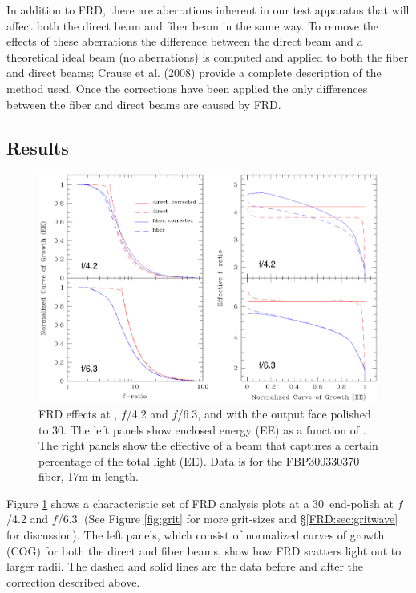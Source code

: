 In addition to FRD, there are aberrations inherent in our test
apparatus that will affect both the direct beam and fiber beam in the
same way. To remove the effects of these aberrations the difference
between the direct beam and a theoretical ideal beam (no aberrations)
is computed and applied to both the fiber and direct beams; Crause et
al. (2008)\cite{Crause_08} provide a complete description of the
method used. Once the corrections have been applied the only
differences between the fiber and direct beams are caused by FRD.

\subsection{Results}
\label{FRD:sec:results}

\begin{figure}[ht]
\begin{center}
\includegraphics[width=\textwidth, trim=0 2.6in 0 0, clip=true]{FRD/figs/basic_FRD.eps}
\caption[Example FRD analysis plots]{\fixspacing\label{fig:basicFRD} FRD
  effects at \filty, $f$/4.2 and $f$/6.3, and with the output face polished to
  30\mum. The left panels show enclosed energy (EE) as a function of
  \fratio. The right panels show the effective \fratio of a beam that captures
  a certain percentage of the total light (EE). Data is for the FBP300330370
  fiber, 17m in length.}
\end{center}
\end{figure}

Figure \ref{fig:basicFRD} shows a characteristic set of FRD analysis
plots at a 30\mum\ end-polish at $f$/4.2 and $f$/6.3.  (See Figure
\ref{fig:grit} for more grit-sizes and \S\ref{FRD:sec:gritwave} for
discussion).  The left panels, which consist of normalized curves of
growth (COG) for both the direct and fiber beams, show how FRD
scatters light out to larger radii. The dashed and solid lines are the
data before and after the correction described above\cite{Crause_08}.

